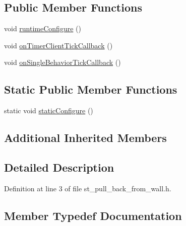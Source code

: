 \subsection*{Public Member Functions}
\begin{DoxyCompactItemize}
\item 
void \hyperlink{structsm__pr2__plugs_1_1StPullBackFromWall_a1be08c0cdc17a5c038cd8549118f98a6}{runtime\+Configure} ()
\item 
void \hyperlink{structsm__pr2__plugs_1_1StPullBackFromWall_a7872156a77c675539830c016e703c499}{on\+Timer\+Client\+Tick\+Callback} ()
\item 
void \hyperlink{structsm__pr2__plugs_1_1StPullBackFromWall_a42e04e36271bd14285b42df5c1988209}{on\+Single\+Behavior\+Tick\+Callback} ()
\end{DoxyCompactItemize}
\subsection*{Static Public Member Functions}
\begin{DoxyCompactItemize}
\item 
static void \hyperlink{structsm__pr2__plugs_1_1StPullBackFromWall_ac2b8294a8c707ed4a4bb867fac511f7f}{static\+Configure} ()
\end{DoxyCompactItemize}
\subsection*{Additional Inherited Members}


\subsection{Detailed Description}


Definition at line 3 of file st\+\_\+pull\+\_\+back\+\_\+from\+\_\+wall.\+h.



\subsection{Member Typedef Documentation}
\mbox{\label{structsm__pr2__plugs_1_1StPullBackFromWall_ae98bee2aa33bf23dc67a168be155e495}} 
